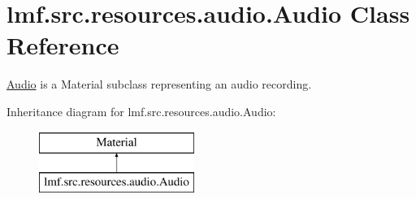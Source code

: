 \hypertarget{classlmf_1_1src_1_1resources_1_1audio_1_1_audio}{\section{lmf.\+src.\+resources.\+audio.\+Audio Class Reference}
\label{classlmf_1_1src_1_1resources_1_1audio_1_1_audio}
}


\hyperlink{classlmf_1_1src_1_1resources_1_1audio_1_1_audio}{Audio} is a Material subclass representing an audio recording.  


Inheritance diagram for lmf.\+src.\+resources.\+audio.\+Audio\+:\begin{figure}[H]
\begin{center}
\leavevmode
\includegraphics[height=2.000000cm]{classlmf_1_1src_1_1resources_1_1audio_1_1_audio}
\end{center}
\end{figure}
